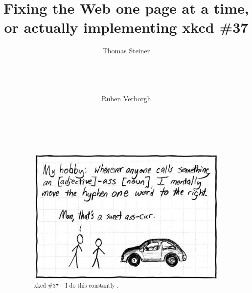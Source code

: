 \documentclass{acm_proc_article-sp}
\begin{document}
\title{Fixing the Web one page at a time,\\ or actually implementing xkcd \#37}

\author{
\alignauthor
Thomas Steiner\\
	\\
	\\
	\\
	\\
\alignauthor
Ruben Verborgh\\
	\\
	\\
	\\
	\\
}
\maketitle

\begin{abstract}
\begin{figure}[h!]
\centering
\includegraphics[width=\columnwidth]{hyphen.jpg}
\caption{xkcd \#37 -- I do this constantly \cite{xkcd37}.}
\label{fig:xkcd37}
\end{figure}
\end{abstract}

\end{document}
